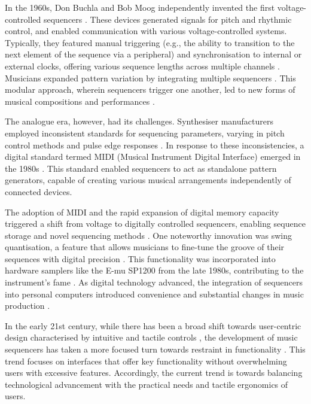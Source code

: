 \documentclass[12pt]{article}
\numberwithin{subsubsubsection}{subsubsection}
\begin{document}
In the 1960s, Don Buchla and Bob Moog independently invented the first voltage-controlled sequencers \cite{Holmes}. These devices generated signals for pitch and rhythmic control, and enabled communication with various voltage-controlled systems. Typically, they featured manual triggering (e.g., the ability to transition to the next element of the sequence via a peripheral) and synchronisation to internal or external clocks, offering various sequence lengths across multiple channels \cite{Holmes}. Musicians expanded pattern variation by integrating multiple sequencers \cite{Strange}. This modular approach, wherein sequencers trigger one another, led to new forms of musical compositions and performances \cite{Strange}.

The analogue era, however, had its challenges. Synthesiser manufacturers employed inconsistent standards for sequencing parameters, varying in pitch control methods and pulse edge responses \cite{Kirk}. In response to these inconsistencies, a digital standard termed MIDI (Musical Instrument Digital Interface) emerged in the 1980s \cite{Diduck}. This standard enabled sequencers to act as standalone pattern generators, capable of creating various musical arrangements independently of connected devices.

The adoption of MIDI and the rapid expansion of digital memory capacity triggered a shift from voltage to digitally controlled sequencers, enabling sequence storage and novel sequencing methods \cite{Manning}. One noteworthy innovation was swing quantisation, a feature that allows musicians to fine-tune the groove of their sequences with digital precision \cite{Katz}. This functionality was incorporated into hardware samplers like the E-mu SP1200 from the late 1980s, contributing to the instrument's fame \cite{Milner}. As digital technology advanced, the integration of sequencers into personal computers introduced convenience and substantial changes in music production \cite{Huber}.

In the early 21st century, while there has been a broad shift towards user-centric design characterised by intuitive and tactile controls \cite{Moggridge}, the development of music sequencers has taken a more focused turn towards restraint in functionality \cite{Bjorn1}. 
This trend focuses on interfaces that offer key functionality without overwhelming users with excessive features. Accordingly, the current trend is towards balancing technological advancement with the practical needs and tactile ergonomics of users.
\end{document}
